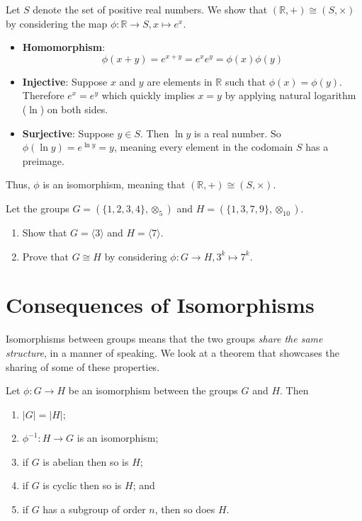 \begin{example}
    Let $S$ denote the set of positive real numbers. We show that $(\mathbb{R}, +) \cong (S, \times)$ by considering the map $\phi: \mathbb{R} \to S, x \mapsto e^x$.
    \begin{itemize}
        \item \textbf{Homomorphism}:
        \[
            \phi(x+y) = e^{x+y} = e^xe^y = \phi(x)\phi(y)
        \]

        \item \textbf{Injective}: Suppose $x$ and $y$ are elements in $\mathbb{R}$ such that $\phi(x) = \phi(y)$. Therefore $e^x = e^y$ which quickly implies $x = y$ by applying natural logarithm ($\ln$) on both sides.

        \item \textbf{Surjective}: Suppose $y \in S$. Then $\ln y$ is a real number. So $\phi(\ln y) = e^{\ln y} = y$, meaning every element in the codomain $S$ has a preimage.
    \end{itemize}

    Thus, $\phi$ is an isomorphism, meaning that $(\mathbb{R}, +) \cong (S, \times)$.
\end{example}

\begin{exercise}
    Let the groups $G = (\{1, 2, 3, 4\}, \otimes_5)$ and $H = (\{1, 3, 7, 9\}, \otimes_{10})$.
    \begin{enumerate}[label=(\roman*)]
        \item Show that $G = \langle 3 \rangle$ and $H = \langle 7 \rangle$.
        \item Prove that $G \cong H$ by considering $\phi: G \to H, 3^k \mapsto 7^k$.
    \end{enumerate}
\end{exercise}

\section{Consequences of Isomorphisms}
Isomorphisms between groups means that the two groups \textit{share the same structure}, in a manner of speaking. We look at a theorem that showcases the sharing of some of these properties.
\begin{theorem}\label{thrm-isomorphism-consequences}
    Let $\phi: G \to H$ be an isomorphism between the groups $G$ and $H$. Then
    \begin{enumerate}
        \item $|G| = |H|$;
        \item $\phi^{-1}: H \to G$ is an isomorphism;
        \item if $G$ is abelian then so is $H$;
        \item if $G$ is cyclic then so is $H$; and
        \item if $G$ has a subgroup of order $n$, then so does $H$.
    \end{enumerate}
\end{theorem}

